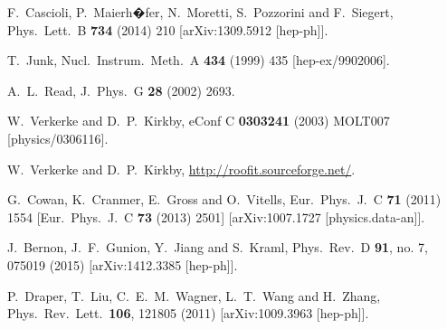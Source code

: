 \documentclass[preprintnumbers,superscriptaddress,nofootinbib,aps,prd,floatfix]{revtex4}
\begin{document}
\begin{thebibliography}{99}
  F.~Cascioli, P.~Maierh�fer, N.~Moretti, S.~Pozzorini and F.~Siegert,
  Phys.\ Lett.\ B {\bf 734} (2014) 210
  [arXiv:1309.5912 [hep-ph]].
 
  T.~Junk,
  Nucl.\ Instrum.\ Meth.\ A {\bf 434} (1999) 435
  [hep-ex/9902006].
  
  A.~L.~Read,
  J.\ Phys.\ G {\bf 28} (2002) 2693.


  W.~Verkerke and D.~P.~Kirkby,
  eConf C {\bf 0303241} (2003) MOLT007
  [physics/0306116].
  
  W.~Verkerke and D.~P.~Kirkby,
\url{http://roofit.sourceforge.net/}.
  
  G.~Cowan, K.~Cranmer, E.~Gross and O.~Vitells,
  Eur.\ Phys.\ J.\ C {\bf 71} (2011) 1554
   [Eur.\ Phys.\ J.\ C {\bf 73} (2013) 2501]
  [arXiv:1007.1727 [physics.data-an]].

  J.~Bernon, J.~F.~Gunion, Y.~Jiang and S.~Kraml,
  Phys.\ Rev.\ D {\bf 91}, no. 7, 075019 (2015)
  [arXiv:1412.3385 [hep-ph]].
 
  P.~Draper, T.~Liu, C.~E.~M.~Wagner, L.~T.~Wang and H.~Zhang,
  Phys.\ Rev.\ Lett.\  {\bf 106}, 121805 (2011)
  [arXiv:1009.3963 [hep-ph]].



\end{thebibliography}
\end{document}

